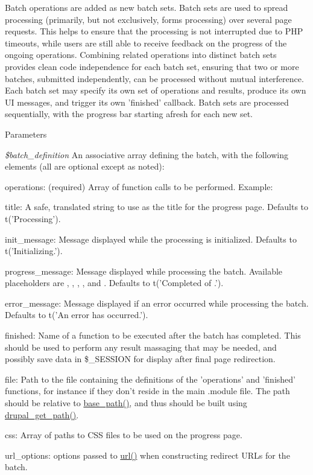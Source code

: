 Batch operations are added as new batch sets. Batch sets are used to spread processing (primarily, but not exclusively, forms processing) over several page requests. This helps to ensure that the processing is not interrupted due to PHP timeouts, while users are still able to receive feedback on the progress of the ongoing operations. Combining related operations into distinct batch sets provides clean code independence for each batch set, ensuring that two or more batches, submitted independently, can be processed without mutual interference. Each batch set may specify its own set of operations and results, produce its own UI messages, and trigger its own 'finished' callback. Batch sets are processed sequentially, with the progress bar starting afresh for each new set.


\begin{DoxyParams}{Parameters}
\item[{\em \$batch\_\-definition}]An associative array defining the batch, with the following elements (all are optional except as noted):
\begin{DoxyItemize}
\item operations: (required) Array of function calls to be performed. Example: 

\item title: A safe, translated string to use as the title for the progress page. Defaults to t('Processing').
\item init\_\-message: Message displayed while the processing is initialized. Defaults to t('Initializing.').
\item progress\_\-message: Message displayed while processing the batch. Available placeholders are , , , ,  and . Defaults to t('Completed  of .').
\item error\_\-message: Message displayed if an error occurred while processing the batch. Defaults to t('An error has occurred.').
\item finished: Name of a function to be executed after the batch has completed. This should be used to perform any result massaging that may be needed, and possibly save data in \$\_\-SESSION for display after final page redirection.
\item file: Path to the file containing the definitions of the 'operations' and 'finished' functions, for instance if they don't reside in the main .module file. The path should be relative to \hyperlink{common_8inc_ae227697e9c239f09fd7e36f71afde771}{base\_\-path()}, and thus should be built using \hyperlink{common_8inc_ae3bbe8f97bf07bb0eaf4580c98f9bf94}{drupal\_\-get\_\-path()}.
\item css: Array of paths to CSS files to be used on the progress page.
\item url\_\-options: options passed to \hyperlink{common_8inc_a43b2a0594431556db49df980801d8807}{url()} when constructing redirect URLs for the batch. 
\end{DoxyItemize}\end{DoxyParams}
